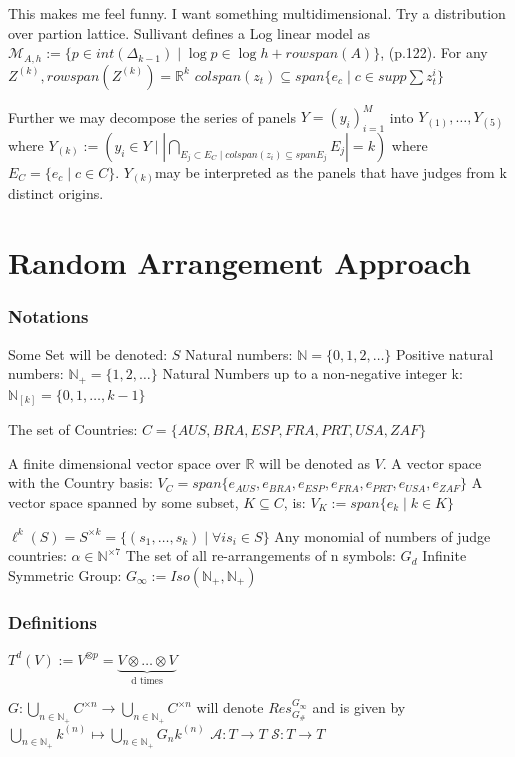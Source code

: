 \documentclass{article}
\begin{document}
This makes me feel funny. I want something multidimensional. Try a distribution over partion lattice.
Sullivant defines a Log linear model as $\mathcal{M}_{A,h} := \{p \in int(\Delta_{k-1}) \mid \log p \in \log h + rowspan(A) \}$, (p.122).
For any $Z^{(k)}, rowspan(Z^{(k)}) = \mathbb{R}^k$
$colspan(z_t) \subseteq span\{e_c \mid c \in supp \sum z_t^i\}$

Further we may decompose the series of panels $Y=(y_i)_{i=1}^M$ into $Y_{(1)}, \dots ,Y_{(5)}$where $Y_{(k)} := (y_i \in Y \mid |\bigcap_{E_j\subset E_C \mid colspan(z_i) \subseteq span E_j} E_j|=k)$ where $E_C = \{e_c \mid c \in C\}$. $Y_{(k)} $may be interpreted as the panels that have judges from k distinct origins. 


\section{Random Arrangement Approach}

\subsubsection{Notations}
Some Set will be denoted: $S$
Natural numbers: $\mathbb{N} = \{0,1,2,\dots\}$
Positive natural numbers: $\mathbb{N_+} = \{1,2,\dots\}$
Natural Numbers up to a non-negative integer k: $\mathbb{N}_{[k]} = \{0,1,\dots,k-1\} $

The set of Countries: $C = \{AUS,BRA,ESP,FRA,PRT,USA,ZAF\}$

A finite dimensional vector space over $\mathbb{R}$ will be denoted as $V$.
A vector space with the Country basis: $V_C = span\{e_{AUS},e_{BRA},e_{ESP},e_{FRA},e_{PRT},e_{USA},e_{ZAF} \}$
A vector space spanned by some subset, $K\subseteq C$, is: $V_K := span\{e_k \mid k \in K\}$

$\ell^k(S) = S^{\times k} = \{(s_1,\dots,s_k)\mid \forall is_i\in S\}$
Any monomial of numbers of judge countries: $\alpha \in \mathbb{N}^{\times 7}$
The set of all re-arrangements of n symbols: $G_d$
Infinite Symmetric Group: $G_\infty := Iso(\mathbb{N_+},\mathbb{N_+}) $
\subsubsection{Definitions}
$T^d(V) := V^{\otimes p} = \underbrace{V\otimes\dots\otimes V}_{\text{d times}} $

$G:\bigcup_{n\in\mathbb{N_+}} C^{\times n}\rightarrow \bigcup_{n\in\mathbb{N_+}} C^{\times n} $ will denote $Res^{G_\infty}_{G_\#}$ and is given by $\bigcup_{n\in \mathbb{N_+}} k^{(n)} \mapsto \bigcup_{n\in \mathbb{N_+}} G_nk^{(n)}$
$\mathcal{A}:T\rightarrow T$
$\mathcal{S}:T\rightarrow T$
\end{document}
